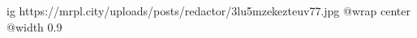  
 
 
 
 

\ifcmt
  ig https://mrpl.city/uploads/posts/redactor/3lu5mzekezteuv77.jpg
  @wrap center
  @width 0.9
\fi
